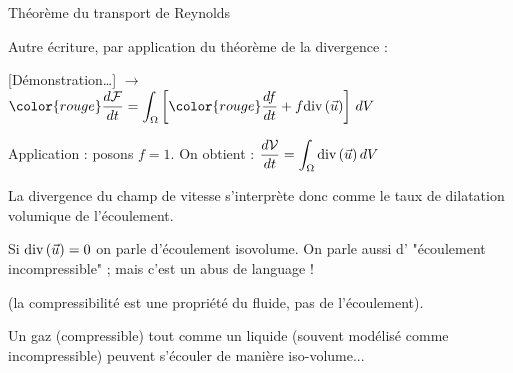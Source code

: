 {\begin{frame}{Théorème du transport de Reynolds}
\pause
\bigskip

Autre écriture, par application du \textcolor{vert}{théorème de la divergence} :

\medskip
\pause

[Démonstration\ldots] \qquad $\longrightarrow$ \qquad
$ \displaystyle \color{rouge}	
\ddt{\mathcal{F}} = 
\int_\Omega \left [{\color{rouge}\ddt{f}} + f\divergence (\myvec{u})\right ] \, dV
$

\medskip
\pause 

Application : posons $f=1$. On obtient :
\smallskip
$	
\displaystyle \frac{d \mathcal{V}}{dt} = 
\int_\Omega  \mbox{\rm div}\, (\vec{u})  \, dV
$

\smallskip
La divergence du champ de vitesse s'interprète donc comme le taux de dilatation volumique de l'écoulement.

Si $\mbox{\rm div}\, (\vec{u}) = 0$ on parle d'écoulement isovolume.
On parle aussi d' "écoulement incompressible" ; mais c'est un abus de language ! 

(la compressibilité est une propriété du fluide, pas de l'écoulement). 

Un gaz (compressible) tout comme un liquide (souvent modélisé comme incompressible) peuvent s'écouler de manière iso-volume...



\end{frame}
}



